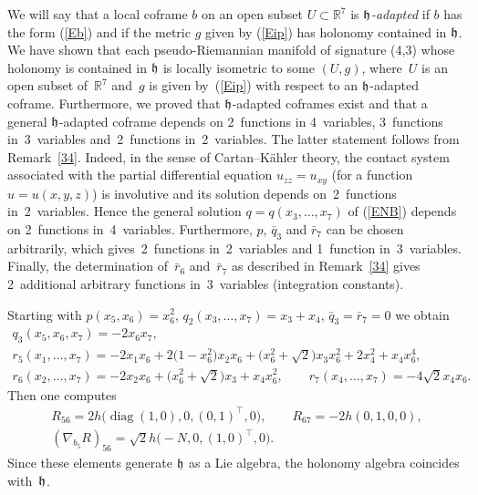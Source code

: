 \documentclass[pdftex]{sigma}
\numberwithin{equation}{section}
\newcommand\fh{{\frak h}}
\newcommand\RR{{\mathbb R}}
\newcommand{\diag}{\operatorname{diag}}
\begin{document}
\begin{Remark} \label{R35} We will say that a local coframe $b$ on an open subset $U\subset \RR^7$ is {\it $\fh$-adapted} if $b$ has the form (\ref{Eb}) and if the metric $g$ given by (\ref{Eip}) has holonomy contained in $\fh$. We have shown that each pseudo-Riemannian manifold of signature (4,3) whose holonomy is contained in $\fh$ is locally isometric to some $(U,g)$, where~$U$ is an open subset of~$\RR^7$ and~$g$ is given by~(\ref{Eip}) with respect to an $\fh$-adapted coframe. Furthermore, we proved that $\fh$-adapted coframes exist and that a general $\fh$-adapted coframe depends on 2~functions in 4~variables, 3~functions in~3~variables and~2~functions in~2~variables. The latter statement follows from Remark~\ref{34}. Indeed, in the sense of Cartan--K\"ahler theory, the contact system associated with the partial differential equation $u_{zz}=u_{xy}$ (for a function $u=u(x,y,z)$) is involutive and its solution depends on~2~functions in~2~variables. Hence the general solution $q=q(x_3,\dots,x_7)$ of (\ref{ENB}) depends on 2~functions in~4~variables. Furthermore, $p$, $\bar q_3$ and $\bar r_7$ can be chosen arbitrarily, which gives~2~functions in~2~variables and 1~function in~3~variables. Finally, the determination of~$\bar r_6$ and~$\bar r_7$ as described in Remark~\ref{34} gives 2~additional arbitrary functions in~3~variables (integration constants).
\end{Remark}

\begin{Example} Starting with $p(x_5,x_6)=x_6^2$, $q_2(x_3,\dots, x_7)=x_3+x_4$, $\bar q_3=\bar r_7=0$ we obtain
\begin{gather*}
q_3(x_5,x_6,x_7) = -2x_6 x_7 ,\\
r_5(x_1,\dots, x_7) = -2x_1 x_6 +2 \big(1-x_6^2\big) x_2 x_6 +\big(x_6^2 +\sqrt2\big)x_3 x_6^2 +2x_4^2 +x_4 x_6^4,\\
r_6(x_2,\dots, x_7) = -2x_2 x_6 +\big(x_6^2 +\sqrt2\big)x_3 +x_4 x_6^2,\qquad
r_7(x_4,\dots, x_7) = -4\sqrt 2x_4 x_6 .
\end{gather*}
Then one computes
\begin{gather*}R_{56}=2h\big(\diag(1,0),0,(0,1)^\top,0\big), \qquad R_{67}=-2h(0,1,0,0), \\ (\nabla_{b_5} R)_{56}=\sqrt2 h\big({-}N,0,(1,0)^\top,0\big).\end{gather*}
Since these elements generate $\fh$ as a Lie algebra, the holonomy algebra coincides with~$\fh$.
\end{Example}
\end{document}
